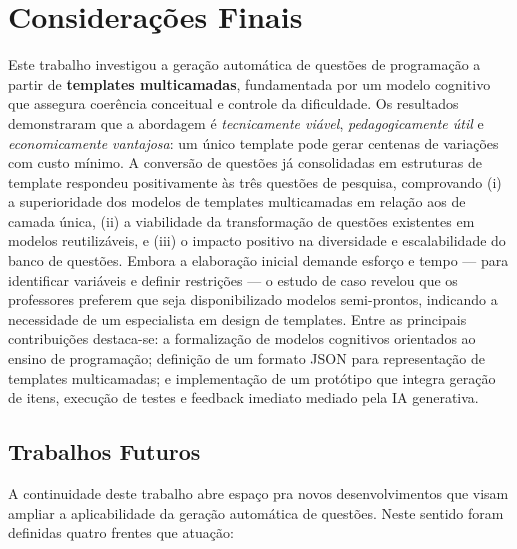 \chapter{Considerações Finais}

Este trabalho investigou a geração automática de questões de programação a partir de \textbf{templates multicamadas}, fundamentada por um modelo cognitivo que assegura coerência conceitual e controle da dificuldade. Os resultados demonstraram que a abordagem é \textit{tecnicamente viável}, \textit{pedagogicamente útil} e \textit{economicamente vantajosa}: um único template pode gerar centenas de variações com custo mínimo. A conversão de questões já consolidadas em estruturas de template respondeu positivamente às três questões de pesquisa, comprovando (i) a superioridade dos modelos de templates multicamadas em relação aos de camada única, (ii) a viabilidade da transformação de questões existentes em modelos reutilizáveis, e (iii) o impacto positivo na diversidade e escalabilidade do banco de questões. Embora a elaboração inicial demande esforço e tempo — para identificar variáveis e definir restrições — o estudo de caso revelou que os professores preferem que seja disponibilizado modelos semi-prontos, indicando a necessidade de um especialista em design de templates. Entre as principais contribuições destaca-se: a formalização de modelos cognitivos orientados ao ensino de programação; definição de um formato JSON para representação de templates multicamadas; e implementação de um protótipo que integra geração de itens, execução de testes e feedback imediato mediado pela IA generativa. 

\section*{Trabalhos Futuros}

A continuidade deste trabalho abre espaço pra novos desenvolvimentos que visam ampliar a aplicabilidade da geração automática de questões. Neste sentido foram definidas quatro frentes que atuação:

